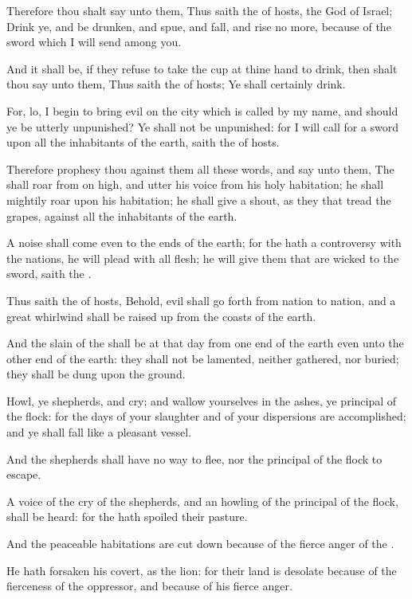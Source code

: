 \Verse Therefore thou shalt say unto them, Thus saith the \LORD of hosts, the God of Israel; Drink ye, and be drunken, and spue, and fall, and rise no more, because of the sword which I will send among you.

\Verse And it shall be, if they refuse to take the cup at thine hand to drink, then shalt thou say unto them, Thus saith the \LORD of hosts; Ye shall certainly drink.

\Verse For, lo, I begin to bring evil on the city which is called by my name, and should ye be utterly unpunished? Ye shall not be unpunished: for I will call for a sword upon all the inhabitants of the earth, saith the \LORD of hosts.

\Verse Therefore prophesy thou against them all these words, and say unto them, The \LORD shall roar from on high, and utter his voice from his holy habitation; he shall mightily roar upon his habitation; he shall give a shout, as they that tread the grapes, against all the inhabitants of the earth.

\Verse A noise shall come even to the ends of the earth; for the \LORD hath a controversy with the nations, he will plead with all flesh; he will give them that are wicked to the sword, saith the \LORD.

\Verse Thus saith the \LORD of hosts, Behold, evil shall go forth from nation to nation, and a great whirlwind shall be raised up from the coasts of the earth.

\Verse And the slain of the \LORD shall be at that day from one end of the earth even unto the other end of the earth: they shall not be lamented, neither gathered, nor buried; they shall be dung upon the ground.

\Verse Howl, ye shepherds, and cry; and wallow yourselves in the ashes, ye principal of the flock: for the days of your slaughter and of your dispersions are accomplished; and ye shall fall like a pleasant vessel.

\Verse And the shepherds shall have no way to flee, nor the principal of the flock to escape.

\Verse A voice of the cry of the shepherds, and an howling of the principal of the flock, shall be heard: for the \LORD hath spoiled their pasture.

\Verse And the peaceable habitations are cut down because of the fierce anger of the \LORD.

\Verse He hath forsaken his covert, as the lion: for their land is desolate because of the fierceness of the oppressor, and because of his fierce anger.


